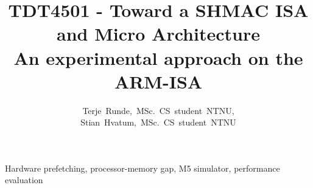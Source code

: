 \documentclass[journal]{IEEEtran}
\begin{document}
\title{\small{TDT4501 - Toward a SHMAC ISA and Micro Architecture}\\\Huge{An experimental approach on the ARM-ISA}}

\author{Terje~Runde,~MSc.~CS~student~NTNU,
        Stian~Hvatum,~MSc.~CS~student~NTNU}

\maketitle



\begin{IEEEkeywords}
Hardware prefetching, processor-memory gap, M5 simulator, performance evaluation
\end{IEEEkeywords}










\end{document}
